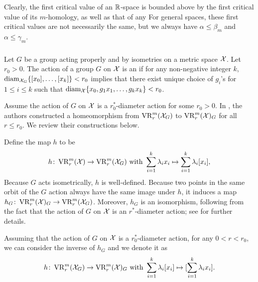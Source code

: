 \medskip\remark
Clearly, the first critical value of an $\mathbb{R}$-space is bounded above by the first critical value of its $m$-homology, as well as that of any 
For general spaces, these first critical values are not necessarily the same, but we always have $\alpha \leq \beta_m$ and $\alpha \leq \gamma_m$.


\subsubsection{}


Let $G$ be a group acting properly and by isometries on a metric space $\mathcal{X}$.
Let $r_0>0$. The action of a group $G$ on $\mathcal{X}$ is an  if for any non-negative integer $k$, $\operatorname{diam}_{\mathcal{X}_G}\{[x_0],\dots,[x_k]\}<r_0$ implies that there exist unique choice of $g_i$'s for $1\leq i\leq k$ such that $\operatorname{diam}_{\mathcal{X}}\{x_0,g_1x_1,\dots,g_kx_k\}<r_0$. 

Assume the action of $G$ on $\mathcal{X}$ is a $r_0^*$-diameter action for some $r_0> 0$.
In \cite[Proposition 3.5]{adams2022metric}, the authors constructed a homeomorphism from $\operatorname{VR}_r^m(\mathcal{X}_G)$ to $\operatorname{VR}_r^m(\mathcal{X})_G$ for all $r \leq r_0$.
We review their constructions below. 

Define the map $h$ to be
\[
h \colon \operatorname{VR}_r^m(\mathcal{X}) \to \operatorname{VR}_r^m(\mathcal{X}_G) 
\text{ with }
\sum_{i=1}^k \lambda_i x_i \mapsto \sum_{i=1}^k \lambda_i [x_i],
\]
Because $G$ acts isometrically, $h$ is well-defined.
Because two points in the same orbit of the $G$ action always have the same image under $h$, it induces a map $h_G \colon \operatorname{VR}_r^m(\mathcal{X})_G \to \operatorname{VR}_r^m(\mathcal{X}_G)$.
Moreover, $h_G$ is an isomorphism, following from the fact that the action of $G$ on $\mathcal{X}$ is an $r^*$-diameter action; see \cite[Proposition 3.5]{adams2022metric} for further details.

Assuming that the action of $G$ on $\mathcal{X}$ is a $r_0^*$-diameter action, for any $0<r<r_0$, we can consider the inverse of $h_G$ and we denote it as
\[
h \colon \operatorname{VR}_r^m(\mathcal{X}_G) \to \operatorname{VR}_r^m(\mathcal{X})_G
\text{ with }
\sum_{i=1}^k \lambda_i [x_i] \mapsto [\sum_{i=1}^k \lambda_i x_i].
\]


